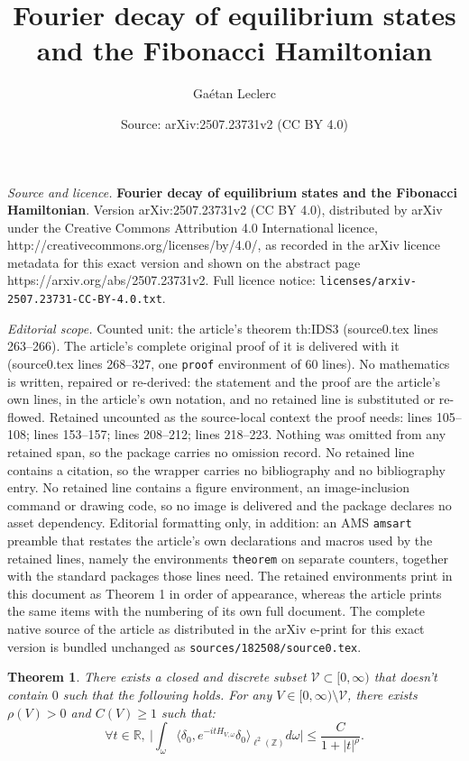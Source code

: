 \documentclass[10pt,a4paper]{amsart}
\title{\textbf{Fourier decay of equilibrium states and the Fibonacci Hamiltonian}}
\author{Ga\'etan Leclerc}
\date{Source: arXiv:2507.23731v2 (CC BY 4.0)}
\newtheorem{theorem}{Theorem}
\begin{document}
\maketitle

\noindent\emph{Source and licence.} \textbf{Fourier decay of equilibrium states and the Fibonacci Hamiltonian}. Version arXiv:2507.23731v2 (CC BY 4.0), distributed by arXiv under the Creative Commons Attribution 4.0 International licence, http://creativecommons.org/licenses/by/4.0/, as recorded in the arXiv licence metadata for this exact version and shown on the abstract page https://arxiv.org/abs/2507.23731v2. Full licence notice: \texttt{licenses/arxiv-2507.23731-CC-BY-4.0.txt}.\par\smallskip

\noindent\textit{Editorial scope.} Counted unit: the article's theorem th:IDS3 (source0.tex lines 263--266). The article's complete original proof of it is delivered with it (source0.tex lines 268--327, one \texttt{proof} environment of 60 lines). No mathematics is written, repaired or re-derived: the statement and the proof are the article's own lines, in the article's own notation, and no retained line is substituted or re-flowed.  Retained uncounted as the source-local context the proof needs: lines 105--108; lines 153--157; lines 208--212; lines 218--223.  Nothing was omitted from any retained span, so the package carries no omission record.  No retained line contains a citation, so the wrapper carries no bibliography and no bibliography entry.  No retained line contains a figure environment, an image-inclusion command or drawing code, so no image is delivered and the package declares no asset dependency.  Editorial formatting only, in addition: an AMS \texttt{amsart} preamble that restates the article's own declarations and macros used by the retained lines, namely the environments \texttt{theorem} on separate counters, together with the standard packages those lines need.  The retained environments print in this document as Theorem 1 in order of appearance, whereas the article prints the same items with the numbering of its own full document.  The complete native source of the article as distributed in the arXiv e-print for this exact version is bundled unchanged as \texttt{sources/182508/source0.tex}.
\begin{theorem}\label{th:IDS1}
There exists a closed and discrete subset $\mathcal{V}\subset [0,\infty)$ that doesn't contain $0$ such that the following holds. For any $V \in [0,\infty) \setminus \mathcal{V}$, there exists $\rho(V)>0$ and $C(V) \geq 1$ such that:
$$ \forall t \in \mathbb{R}, \ \Big| \int_\omega \langle \delta_0, e^{-it H_{V,\omega}} \delta_0 \rangle_{\ell^2(\mathbb{Z})} d\omega \Big| \leq \frac{C}{1+|t|^\rho}. $$
\end{theorem}
\end{document}
